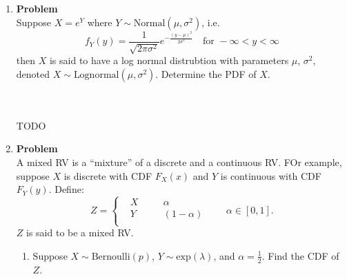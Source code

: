 \documentclass[12pt]{article}
\newenvironment{Ex}{\textbf{Problem}\vspace{.75em}\\}{}
\begin{document}
\begin{enumerate}
\begin{Ex}
    variable with parameter $\alpha_i$.
    \begin{enumerate}
    \item Find the PDF of $T$, the time taken to service a customer.
    \item Find $E[T]$ and $\text{Var}(T)$. You should find expressions
      in terms of $p_i$ and $\alpha_i$, where $i = 1,\ldots,n$
    \item Suppose $T > 5$. Find an expression for the probability that
      clerk $i$ served the customer. Hint: You will need to use a
      version of Bayes Rule.
    \end{enumerate}
    \begin{solution} \hfill \\\\ {\huge TODO}
    \end{solution}
  \end{Ex}
\item
  \begin{Ex}
    Suppose $X = e^Y$ where $Y\sim \text{Normal}(\mu, \sigma^2)$, i.e.
    \begin{equation}
      \label{eq:5-question}
      f_Y(y) =
      \frac{1}{\sqrt{2\pi\sigma^2}}e^{-\frac{(y-\mu)^2}{2\sigma^2}}
      \quad\text{for }-\infty < y < \infty
    \end{equation}
    then $X$ is said to have a log normal distrubtion with parameters
    $\mu$, $\sigma^2$, denoted $X \sim
    \text{Lognormal}(\mu,\sigma^2)$. Determine the PDF of $X$.
    \begin{solution} \hfill \\\\ {\huge TODO}
    \end{solution}
  \end{Ex}
\item
  \begin{Ex}
    A mixed RV is a ``mixture'' of a discrete and a continuous RV. FOr
    example, suppose $X$ is discrete with CDF $F_X(x)$ and $Y$ is
    continuous with CDF $F_Y(y)$. Define:
    \begin{equation}
      \label{eq:6-question}
      Z = \left\{
        \begin{aligned}
          & X &&\quad \alpha \\
          & Y &&\quad (1-\alpha) \\
        \end{aligned} \right.
      \quad\quad\alpha \in [0,1].
    \end{equation}
    $Z$ is said to be a mixed RV.
    \begin{enumerate}
    \item Suppose $X \sim \text{Bernoulli}(p)$, $Y\sim
      \text{exp}(\lambda)$, and $\alpha=\frac{1}{2}$. Find the CDF of
      $Z$.


\end{enumerate}
\end{Ex}
\end{enumerate}
\end{document}

